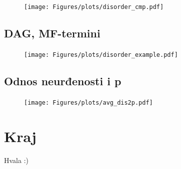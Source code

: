 \documentclass{beamer}
\begin{document}
\begin{frame}
  \begin{figure}[th]
    \vspace*{-0.8cm}
    \hspace*{-0.45cm}
    \texttt{[image: Figures/plots/disorder\_cmp.pdf]}
  \end{figure}
\end{frame}




\subsection{DAG, MF-termini}

\begin{frame}
  \begin{figure}
    \vspace{-0.7cm}
    \texttt{[image: Figures/plots/disorder\_example.pdf]}
  \end{figure}
\end{frame}


%


\subsection{Odnos neurđenosti i p}
\begin{frame}
  \begin{figure}
    \centering
    \texttt{[image: Figures/plots/avg\_dis2p.pdf]}
  \end{figure}
\end{frame}

\section{Kraj}

\begin{frame}
  \begin{center}
    \Huge Hvala :)
  \end{center}
\end{frame}
\end{document}
